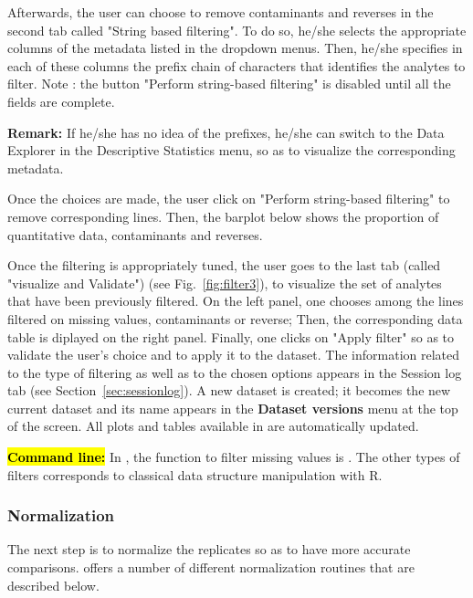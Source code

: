 \documentclass[12pt]{article}
\begin{document}
{Afterwards, the user can choose to remove contaminants and reverses in the 
second tab called "String based filtering". To do so, he/she selects the 
appropriate columns of the metadata listed in the dropdown menus. Then, 
he/she specifies in each of these columns the prefix chain of characters 
that identifies the analytes to filter. Note : the button "Perform string-based 
filtering" is disabled until all the fields are complete.

\textbf{Remark:} If he/she has no idea of the prefixes, he/she can switch to 
the Data Explorer in the Descriptive Statistics menu, so as to visualize the 
corresponding metadata. 

Once the choices are made, the user click on "Perform string-based filtering" 
to remove corresponding lines. Then, the barplot below  shows the 
proportion of quantitative data, contaminants and reverses. 

{Once the filtering is appropriately tuned, the user goes to the last tab 
(called "visualize and Validate") (see Fig.~\ref{fig:filter3}), to visualize 
the set of analytes that have been previously filtered. On the left panel, 
one chooses among the lines filtered on missing values, contaminants or 
reverse; Then, the corresponding data table is diplayed on the right panel. 
Finally, one clicks on "Apply filter" so as to validate the user's choice and 
to apply it to the dataset. The information related to the type of filtering 
as well as to the chosen options appears in the Session log tab (see 
Section~\ref{sec:sessionlog}). A new dataset is created; it becomes the new 
current dataset and its name appears in the \textbf{Dataset versions} menu at 
the top of the screen. All plots and tables available in  
are automatically updated.}

\hl{\bf Command line:} In , the function to filter missing 
values is . The other types of filters corresponds to 
classical data structure manipulation with R.


\subsubsection{Normalization}\label{sec:normalization}

The next step is to normalize the replicates so as to have more accurate 
comparisons.  offers a number of different normalization 
routines that are described below.

}
\end{document}
